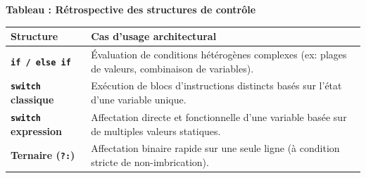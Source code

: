 \begin{center}
    \textbf{Tableau : Rétrospective des structures de contrôle} \\[0.3cm]
    \begin{tabular}{@{}lp{10cm}@{}}
        \toprule
        \textbf{Structure} & \textbf{Cas d'usage architectural} \\
        \midrule
        \textbf{\texttt{if / else if}} & Évaluation de conditions hétérogènes complexes (ex: plages de valeurs, combinaison de variables). \\
        \textbf{\texttt{switch} classique} & Exécution de blocs d'instructions distincts basés sur l'état d'une variable unique. \\
        \textbf{\texttt{switch} expression} & Affectation directe et fonctionnelle d'une variable basée sur de multiples valeurs statiques. \\
        \textbf{Ternaire (\texttt{?:})} & Affectation binaire rapide sur une seule ligne (à condition stricte de non-imbrication). \\
        \bottomrule
    \end{tabular}
\end{center}
